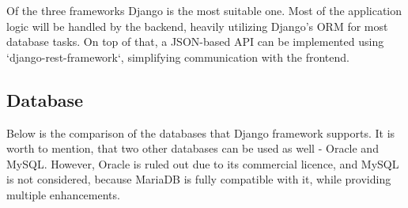 Of the three frameworks Django is the most suitable one.
Most of the application logic will be handled by the backend, heavily utilizing
Django's ORM for most database tasks. On top of that, a JSON-based API can be implemented
using `django-rest-framework`, simplifying communication with the frontend.

\subsection{Database}
Below is the comparison of the databases that Django framework supports.
It is worth to mention, that two other databases can be used as well - Oracle and MySQL.
However, Oracle is ruled out due to its commercial licence, and MySQL is not considered, because
MariaDB is fully compatible with it, while providing multiple enhancements.

